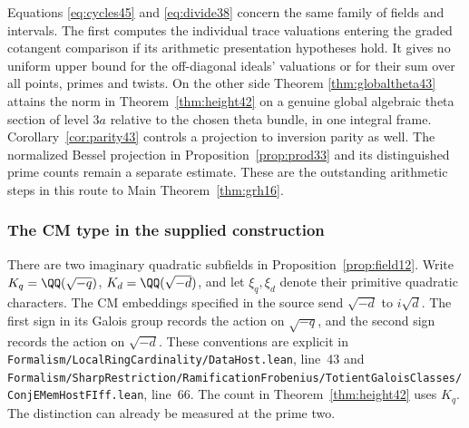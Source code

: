 \documentclass[a4paper,11pt]{article}
\theoremstyle{definition}
\theoremstyle{remark}
\newcommand{\srcloc}[2]{{\small\nolinkurl{#1.lean}}, line~#2}
\numberwithin{equation}{section}
\begin{document}
Equations \eqref{eq:cycles45} and \eqref{eq:divide38} concern the same family of fields and intervals. The first computes the individual trace valuations entering the graded cotangent comparison if its arithmetic presentation hypotheses hold. It gives no uniform upper bound for the off-diagonal ideals' valuations or for their sum over all points, primes and twists. On the other side Theorem \ref{thm:globaltheta43} attains the norm in Theorem~\ref{thm:height42} on a genuine global algebraic theta section of level \(3a\) relative to the chosen theta bundle, in one integral frame. Corollary~\ref{cor:parity43} controls a projection to inversion parity as well. The normalized Bessel projection in Proposition~\ref{prop:prod33} and its distinguished prime counts remain a separate estimate. These are the outstanding arithmetic steps in this route to Main Theorem~\ref{thm:grh16}.

\subsubsection{The CM type in the supplied construction}\label{nav:I-29}
There are two imaginary quadratic subfields in Proposition~\ref{prop:field12}.
Write \(K_q=\QQ(\sqrt{-q})\), \(K_d=\QQ(\sqrt{-d})\), and let
\(\xi_q,\xi_d\) denote their primitive quadratic characters.
The CM embeddings specified in the source send \(\sqrt{-d}\) to
\(i\sqrt d\). The first sign in its Galois group records the action on
\(\sqrt{-q}\), and the second sign records the action on \(\sqrt{-d}\).
These conventions are explicit in
\srcloc{Formalism/LocalRingCardinality/DataHost}{43} and
\srcloc{Formalism/SharpRestriction/RamificationFrobenius/TotientGaloisClasses/ConjEMemHostFIff}{66}.
The count in Theorem~\ref{thm:height42} uses \(K_q\). The distinction
can already be measured at the prime two.
\end{document}
